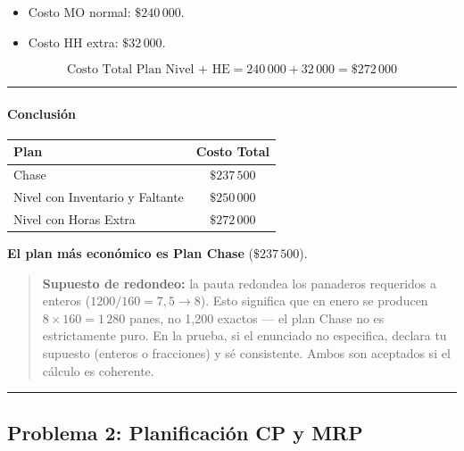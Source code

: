 \documentclass[
]{article}
\providecommand{\tightlist}{%
  \setlength{\itemsep}{0pt}\setlength{\parskip}{0pt}}
\begin{document}
\begin{itemize}
\tightlist
\item
  Costo MO normal: \(\$240\,000\).
\item
  Costo HH extra: \(\$32\,000\).
\end{itemize}

\[\boxed{\text{Costo Total Plan Nivel + HE} = 240\,000 + 32\,000 = \$272\,000}\]

\begin{center}\rule{0.5\linewidth}{0.5pt}\end{center}

\hypertarget{conclusiuxf3n}{%
\paragraph{Conclusión}\label{conclusiuxf3n}}

\begin{longtable}[]{@{}lc@{}}
\toprule\noalign{}
Plan & Costo Total \\
\midrule\noalign{}
\endhead
\bottomrule\noalign{}
\endlastfoot
Chase & \(\$237\,500\) \\
Nivel con Inventario y Faltante & \(\$250\,000\) \\
Nivel con Horas Extra & \(\$272\,000\) \\
\end{longtable}

\textbf{El plan más económico es Plan Chase} (\(\$237\,500\)).

\begin{quote}
\textbf{Supuesto de redondeo:} la pauta redondea los panaderos
requeridos a enteros (\(1200/160 = 7{,}5 \to 8\)). Esto significa que en
enero se producen \(8 \times 160 = 1\,280\) panes, no 1,200 exactos ---
el plan Chase no es estrictamente puro. En la prueba, si el enunciado no
especifica, declara tu supuesto (enteros o fracciones) y sé consistente.
Ambos son aceptados si el cálculo es coherente.
\end{quote}

\begin{center}\rule{0.5\linewidth}{0.5pt}\end{center}

\hypertarget{problema-2-planificaciuxf3n-cp-y-mrp}{%
\subsection{Problema 2: Planificación CP y
MRP}\label{problema-2-planificaciuxf3n-cp-y-mrp}}
\end{document}
